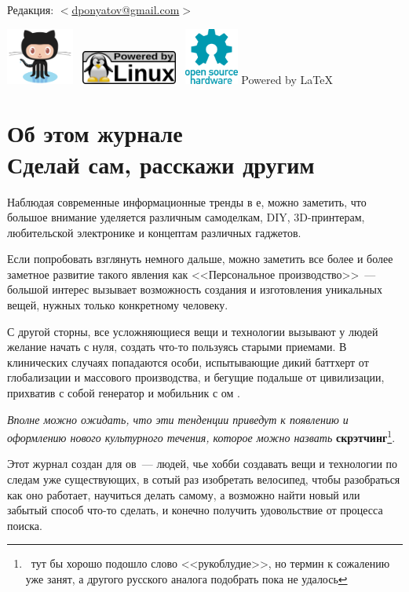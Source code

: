 \documentclass{magazine}
\begin{document}
\begin{titlepage}
\bigskip
Редакция: $<$\href{mailto:dponyatov@gmail.com}{dponyatov@gmail.com}$>$

\bigskip
\href{https://github.com/ponyatov/scratcher}{\includegraphics[height=5em]{logo/GitHub.png}}
\ \includegraphics[height=3em]{logo/linuxpowered.png}
\ \includegraphics[height=5em]{logo/OpenHardware.png}
{\Large Powered by \LaTeX}

\end{titlepage}

\tableofcontents\clearpage

\section{Об этом журнале\\Сделай сам, расскажи другим}
\begin{multicols}{2}

Наблюдая современные информационные тренды в \internet е, можно заметить, что
большое внимание уделяется различным самоделкам, DIY, 3D-принтерам, любительской
электронике и концептам различных гаджетов.

Если попробовать взглянуть немного дальше, можно заметить все более и более
заметное развитие такого явления как <<Персональное производство>>\ --- большой
интерес вызывает возможность создания и изготовления уникальных вещей, 
нужных только конкретному человеку.

С другой сторны, все усложняющиеся вещи и технологии вызывают у людей желание
начать с нуля, создать что-то пользуясь старыми приемами. В клинических
случаях попадаются особи, испытывающие дикий баттхерт от глобализации и
массового производства, и бегущие подальше от цивилизации, прихватив с собой
генератор и мобильник с \internet ом \smiley.

\emph{
Вполне можно ожидать, что эти тенденции приведут к появлению и оформлению нового
культурного течения, которое можно назвать} \textbf{скрэтчинг}\footnote{\ тут бы
хорошо подошло слово <<рукоблудие>>, но термин к сожалению уже занят, а
другого русского аналога подобрать пока не удалось}.

Этот журнал создан для \scr ов\ --- людей, чье хобби создавать вещи и технологии
по следам уже существующих, в сотый раз изобретать велосипед, чтобы разобраться
как оно работает, научиться делать самому, а возможно найти новый или забытый
способ что-то сделать, и конечно получить удовольствие от процесса поиска. 

\end{multicols}
\end{document}

